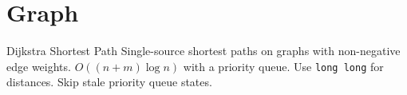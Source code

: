 \section{Graph}
\label{sec:graph}

\AlgorithmEntry
  {Dijkstra Shortest Path}
  {Single-source shortest paths on graphs with non-negative edge weights.}
  {$O((n + m)\log n)$ with a priority queue.}
  {Use \texttt{long long} for distances. Skip stale priority queue states.}


